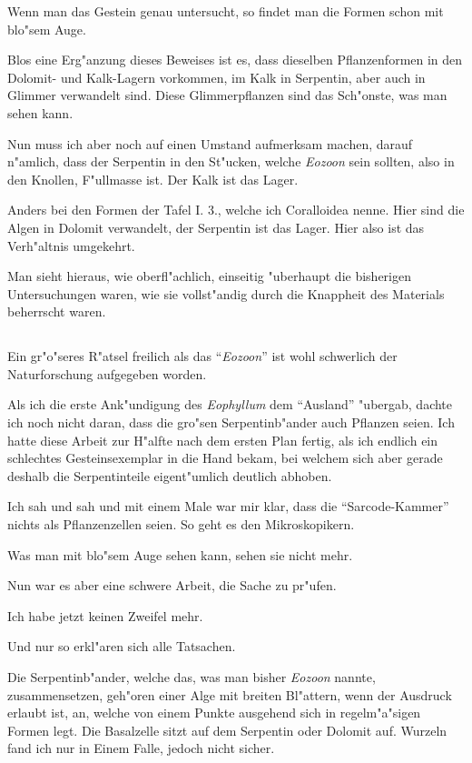 \documentclass[a4paper, 11pt, oneside, german]{article}
\begin{document}
Wenn man das Gestein genau untersucht, so findet man die Formen schon mit blo"sem Auge.

Blos eine Erg"anzung dieses Beweises ist es, dass dieselben Pflanzenformen in den Dolomit- und Kalk-Lagern vorkommen, im Kalk in Serpentin, aber auch in Glimmer verwandelt sind. Diese Glimmerpflanzen sind das Sch"onste, was man sehen kann.

Nun muss ich aber noch auf einen Umstand aufmerksam machen, darauf n"amlich, dass der Serpentin in den St"ucken, welche \emph{Eozoon} sein sollten, also in den Knollen, F"ullmasse ist. Der Kalk ist das Lager.

Anders bei den Formen der Tafel I. 3., welche ich Coralloidea nenne. Hier sind die Algen in Dolomit verwandelt, der Serpentin ist das Lager. Hier also ist das Verh"altnis umgekehrt.

Man sieht hieraus, wie oberfl"achlich, einseitig "uberhaupt die bisherigen Untersuchungen waren, wie sie vollst"andig durch die Knappheit des Materials beherrscht waren.
\clearpage
\subsection{}
\paragraph{}
Ein gr"o"seres R"atsel freilich als das "`\emph{Eozoon}"' ist wohl schwerlich der Naturforschung aufgegeben worden.

Als ich die erste Ank"undigung des \emph{Eophyllum} dem "`Ausland"' "ubergab, dachte ich noch nicht daran, dass die gro"sen Serpentinb"ander auch Pflanzen seien. Ich hatte diese Arbeit zur H"alfte nach dem ersten Plan fertig, als ich endlich ein schlechtes Gesteinsexemplar in die Hand bekam, bei welchem sich aber gerade deshalb die Serpentinteile eigent"umlich deutlich abhoben.

Ich sah und sah und mit einem Male war mir klar, dass die "`Sarcode-Kammer"' nichts als Pflanzenzellen seien. So geht es den Mikroskopikern.

Was man mit blo"sem Auge sehen kann, sehen sie nicht mehr.

Nun war es aber eine schwere Arbeit, die Sache zu pr"ufen.

Ich habe jetzt keinen Zweifel mehr.

Und nur so erkl"aren sich alle Tatsachen.

Die Serpentinb"ander, welche das, was man bisher \emph{Eozoon} nannte, zusammensetzen, geh"oren einer Alge mit breiten Bl"attern, wenn der Ausdruck erlaubt ist, an, welche von einem Punkte ausgehend sich in regelm"a"sigen Formen legt. Die Basalzelle sitzt auf dem Serpentin oder Dolomit auf. Wurzeln fand ich nur in Einem Falle, jedoch nicht sicher.
\end{document}
